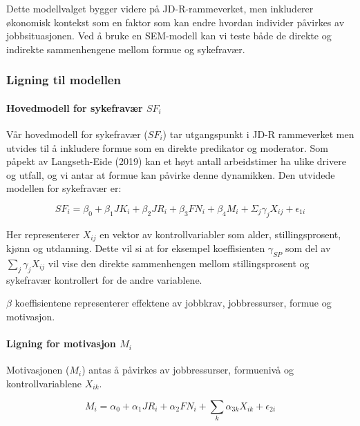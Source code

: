 \documentclass[
  12pt,
  a4paper,
  DIV=11,
  numbers=noendperiod]{scrartcl}
\let\oldparagraph\paragraph
\renewcommand{\paragraph}[1]{\oldparagraph{#1}\mbox{}}
\begin{document}
Dette modellvalget bygger videre på JD-R-rammeverket, men inkluderer
økonomisk kontekst som en faktor som kan endre hvordan individer
påvirkes av jobbsituasjonen. Ved å bruke en SEM-modell kan vi teste både
de direkte og indirekte sammenhengene mellom formue og sykefravær.

\subsubsection{Ligning til modellen}\label{ligning-til-modellen}

\paragraph{\texorpdfstring{Hovedmodell for sykefravær
\(SF_i\)}{Hovedmodell for sykefravær SF\_i}}\label{hovedmodell-for-sykefravuxe6r-sf_i}

Vår hovedmodell for sykefravær (\(SF_i\)) tar utgangspunkt i JD-R
rammeverket men utvides til å inkludere formue som en direkte predikator
og moderator. Som påpekt av Langseth-Eide (2019) kan et høyt antall
arbeidstimer ha ulike drivere og utfall, og vi antar at formue kan
påvirke denne dynamikken. Den utvidede modellen for sykefravær er:

\[
SF_i = \beta_0 + \beta_1 JK_i + \beta_2 JR_i + \beta_3 FN_i
        + \beta_4 M_i + \Sigma_j \gamma_{j}X_{ij} + \epsilon_{1i} \label{eq:sf_utvidet}
\]

Her representerer \(X_{ij}\) en vektor av kontrollvariabler som alder,
stillingsprosent, kjønn og utdanning. Dette vil si at for eksempel
koeffisienten \(\gamma_{SP}\) som del av \(\sum_j \gamma_{j}X_{ij}\) vil
vise den direkte sammenhengen mellom stillingsprosent og sykefravær
kontrollert for de andre variablene.

\(\beta\) koeffisientene representerer effektene av jobbkrav,
jobbressurser, formue og motivasjon.

\paragraph{\texorpdfstring{Ligning for motivasjon
\(M_i\)}{Ligning for motivasjon M\_i}}\label{ligning-for-motivasjon-m_i}

Motivasjonen (\(M_i\)) antas å påvirkes av jobbressurser, formuenivå og
kontrollvariablene \(X_{ik}\).

\[
M_i = \alpha_0 + \alpha_1 JR_i + \alpha_2 FN_i + \sum_k \alpha_{3k}X_{ik} + \epsilon_{2i} \label{eq:motivasjon}
\]
\end{document}
